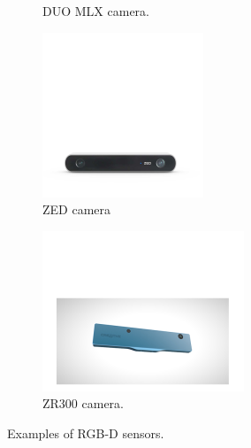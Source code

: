 \documentclass[11pt,openany]{book}
\begin{document}
\begin{figure}[H]
\begin{subfigure}[H]{0.4\linewidth}
        \caption{{DUO MLX camera.}}
        \label{fig:2.15b}
    \end{subfigure}
    \begin{subfigure}[H]{0.4\linewidth}
        \centering
        \includegraphics[width=\linewidth]{assets/2_15_c.png}
        \caption{{ZED camera}}
        \label{fig:2.15c}
    \end{subfigure}
    \begin{subfigure}[H]{0.4\linewidth}
        \centering
        \includegraphics[width=\linewidth]{assets/2_15_d.png}
        \caption{{ZR300 camera.}}
        \label{fig:2.15d}
    \end{subfigure}
    \caption{Examples of RGB-D sensors.}
    \label{fig:2.15}
\end{figure}
\end{document}
